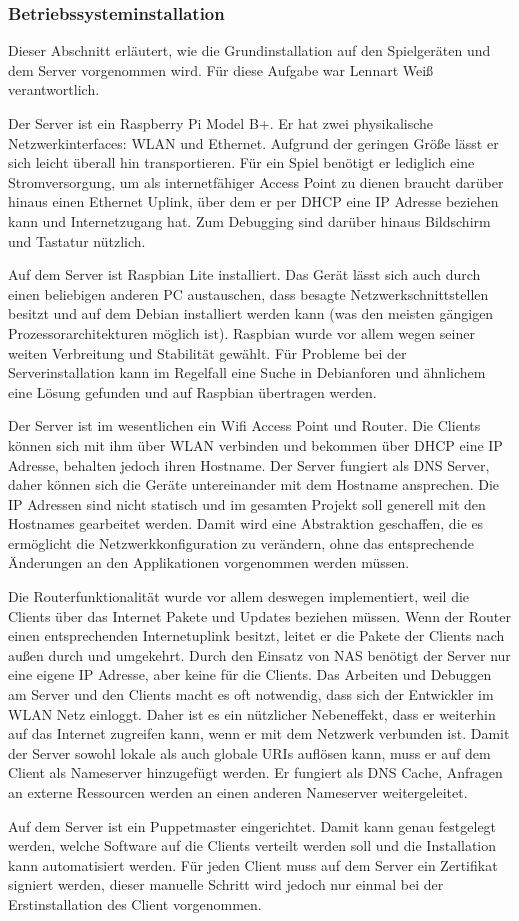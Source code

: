 \subsubsection{Betriebssysteminstallation}

Dieser Abschnitt erläutert, wie die Grundinstallation auf den Spielgeräten und dem Server
vorgenommen wird.
Für diese Aufgabe war Lennart Weiß verantwortlich.

Der Server ist ein Raspberry Pi Model B+.
Er hat zwei physikalische Netzwerkinterfaces: WLAN und Ethernet.
Aufgrund der geringen Größe lässt er sich leicht überall hin transportieren.
Für ein Spiel benötigt er lediglich eine Stromversorgung, um als internetfähiger Access Point zu
dienen braucht darüber hinaus einen Ethernet Uplink, über dem er per DHCP eine IP Adresse beziehen
kann und Internetzugang hat.
Zum Debugging sind darüber hinaus Bildschirm und Tastatur nützlich.

Auf dem Server ist Raspbian Lite installiert.
Das Gerät lässt sich auch durch einen beliebigen anderen PC austauschen, dass besagte
Netzwerkschnittstellen besitzt und auf dem Debian installiert werden kann (was den meisten gängigen
Prozessorarchitekturen möglich ist).
Raspbian wurde vor allem wegen seiner weiten Verbreitung und Stabilität gewählt.
Für Probleme bei der Serverinstallation kann im Regelfall eine Suche in Debianforen und ähnlichem
eine Lösung gefunden und auf Raspbian übertragen werden.

Der Server ist im wesentlichen ein Wifi Access Point und Router.
Die Clients können sich mit ihm über WLAN verbinden und bekommen über DHCP eine IP Adresse, behalten
jedoch ihren Hostname.
Der Server fungiert als DNS Server, daher können sich die Geräte untereinander mit dem Hostname
ansprechen.
Die IP Adressen sind nicht statisch und im gesamten Projekt soll generell mit den Hostnames
gearbeitet werden.
Damit wird eine Abstraktion geschaffen, die es ermöglicht die Netzwerkkonfiguration zu verändern,
ohne das entsprechende Änderungen an den Applikationen vorgenommen werden müssen.

Die Routerfunktionalität wurde vor allem deswegen implementiert, weil die Clients über das Internet
Pakete und Updates beziehen müssen.
Wenn der Router einen entsprechenden Internetuplink besitzt, leitet er die Pakete der Clients nach
außen durch und umgekehrt.
Durch den Einsatz von NAS benötigt der Server nur eine eigene IP Adresse, aber keine für die
Clients.
Das Arbeiten und Debuggen am Server und den Clients macht es oft notwendig, dass sich der Entwickler
im WLAN Netz einloggt.
Daher ist es ein nützlicher Nebeneffekt, dass er weiterhin auf das Internet zugreifen kann, wenn er
mit dem Netzwerk verbunden ist.
Damit der Server sowohl lokale als auch globale URIs auflösen kann, muss er auf dem Client als
Nameserver hinzugefügt werden.
Er fungiert als DNS Cache, Anfragen an externe Ressourcen werden an einen anderen Nameserver
weitergeleitet.

Auf dem Server ist ein Puppetmaster eingerichtet.
Damit kann genau festgelegt werden, welche Software auf die Clients verteilt werden soll und die
Installation kann automatisiert werden.
Für jeden Client muss auf dem Server ein Zertifikat signiert werden, dieser manuelle Schritt wird
jedoch nur einmal bei der Erstinstallation des Client vorgenommen.
